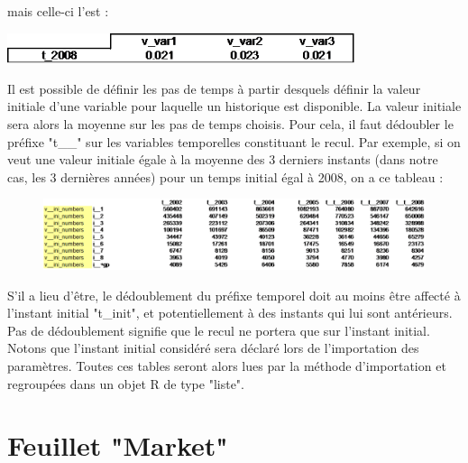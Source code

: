 \documentclass[12pt, colorinlistoftodos]{article}
\newenvironment{not used}[1]{%
    \longtable{%
        |>{\centering$\displaystyle}A{#1}{1}<{$}%
        |}\hline\ignorespaces}{%
    \endlongtable\ignorespacesafterend}
\newcommand\Warning{%
 \makebox[1.4em][c]{%
 \makebox[0pt][c]{\raisebox{.1em}{\small!}}%
 \makebox[0pt][c]{\color{red}\Large$\bigtriangleup$}}}%
\begin{document}
\begin{itemize}
    mais celle-ci l'est :

    \begin{minipage}{\linewidth}
        \centering
        \includegraphics[width = 10.2cm]{figures/param/stock7.png}
    \end{minipage}
    \vspace{12pt}

\end{itemize}


Il est possible de définir les pas de temps à partir desquels définir la valeur initiale d'une variable pour laquelle un historique est disponible. La valeur initiale sera alors la moyenne sur les pas de temps choisis. Pour cela, il faut dédoubler le préfixe "t\_\_" sur les variables temporelles constituant le recul. Par exemple, si on veut une valeur initiale égale à la moyenne des 3 derniers instants (dans notre cas, les 3 dernières années) pour un temps initial égal à 2008, on a ce tableau :

\begin{figure}[h!]
    \begin{center}
    \includegraphics[width = \textwidth]{figures/param/stock8.png}
    \end{center}
    \label{fig:time}
\end{figure}

\Warning S'il a lieu d'être, le dédoublement du  préfixe temporel doit au moins être affecté à l'instant initial "t\_init", et potentiellement à des instants qui lui sont antérieurs. Pas de dédoublement signifie que le recul ne portera que sur l'instant initial. Notons que l'instant initial considéré sera déclaré lors de l'importation des paramètres. Toutes ces tables seront alors lues par la méthode d'importation et regroupées dans un objet R de type "liste".


\section{Feuillet "Market"}
\end{document}

